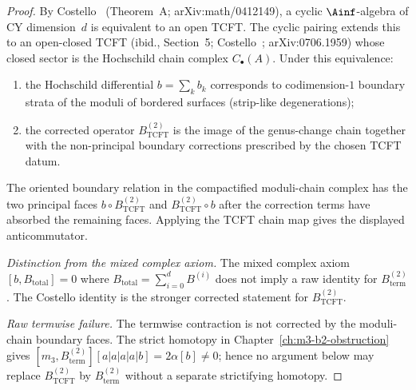 \begin{proof}
By Costello~\cite{Costello2005TCFT} (Theorem~A; arXiv:math/0412149), a cyclic $\Ainf$-algebra of CY dimension~$d$ is equivalent to an open TCFT. The cyclic pairing extends this to an open-closed TCFT (ibid., Section~5; Costello~\cite{Costello2007Ainfty}; arXiv:0706.1959) whose closed sector is the Hochschild chain complex $C_\bullet(A)$. Under this equivalence:
\begin{enumerate}[label=\textup{(\roman*)}]
 \item the Hochschild differential $b = \sum_k b_k$ corresponds to codimension-$1$ boundary strata of the moduli of bordered surfaces (strip-like degenerations);
 \item the corrected operator $B^{(2)}_{\mathrm{TCFT}}$ is the image of
 the genus-change chain together with the non-principal boundary
 corrections prescribed by the chosen TCFT datum.
\end{enumerate}
The oriented boundary relation in the compactified moduli-chain complex
has the two principal faces $b\circ B^{(2)}_{\mathrm{TCFT}}$ and
$B^{(2)}_{\mathrm{TCFT}}\circ b$ after the correction terms have absorbed
the remaining faces. Applying the TCFT chain map gives the displayed
anticommutator.

\smallskip\noindent\emph{Distinction from the mixed complex axiom.}
The mixed complex axiom $[b, B_{\mathrm{total}}] = 0$ where
$B_{\mathrm{total}} = \sum_{i=0}^{d} B^{(i)}$ does not imply a raw
identity for $B^{(2)}_{\mathrm{term}}$. The Costello identity is the
stronger corrected statement for $B^{(2)}_{\mathrm{TCFT}}$.

\medskip\noindent\emph{Raw termwise failure.}
The termwise contraction is not corrected by the moduli-chain boundary
faces. The strict homotopy in
Chapter~\ref{ch:m3-b2-obstruction} gives
$[m_3,B^{(2)}_{\mathrm{term}}][a|a|a|a|b]=2\alpha[b]\neq0$; hence no
argument below may replace $B^{(2)}_{\mathrm{TCFT}}$ by
$B^{(2)}_{\mathrm{term}}$ without a separate strictifying homotopy.
\end{proof}


